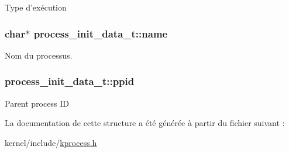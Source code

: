 Type d'exécution \hypertarget{structprocess__init__data__t_a6bdcab0bceaafa6e65a236904fb5a157}{
\subsubsection[{name}]{\setlength{\rightskip}{0pt plus 5cm}char$\ast$ process\-\_\-init\-\_\-data\-\_\-t\-::name}}\label{structprocess__init__data__t_a6bdcab0bceaafa6e65a236904fb5a157}
Nom du processus. \hypertarget{structprocess__init__data__t_a34f85f3f56546700b1dc942070944e27}{
\subsubsection[{ppid}]{ process\-\_\-init\-\_\-data\-\_\-t\-::ppid}}\label{structprocess__init__data__t_a34f85f3f56546700b1dc942070944e27}
Parent process I\-D 

La documentation de cette structure a été générée à partir du fichier suivant \-:\begin{DoxyCompactItemize}
\item 
kernel/include/\hyperlink{kprocess_8h}{kprocess.\-h}\end{DoxyCompactItemize}
